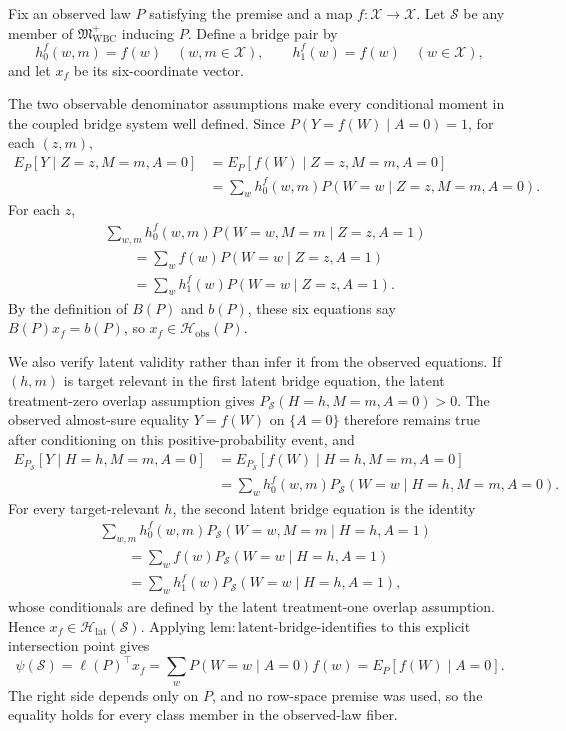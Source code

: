 Fix an observed law \(P\) satisfying the premise and a map
\(f:\mathcal X\to\mathcal X\).  Let \(\mathcal S\) be any member of
\(\mathfrak M_{\mathrm{WBC}}^{+}\) inducing \(P\).  Define a bridge pair by
\[
 h_0^f(w,m)=f(w)\quad(w,m\in\mathcal X),
 \qquad h_1^f(w)=f(w)\quad(w\in\mathcal X),
\]
and let \(x_f\) be its six-coordinate vector.

The two observable denominator assumptions make every conditional moment in
the coupled bridge system well defined.  Since
\(P(Y=f(W)\mid A=0)=1\), for each \((z,m)\),
\[
\begin{aligned}
 E_P[Y\mid Z=z,M=m,A=0]
 &=E_P[f(W)\mid Z=z,M=m,A=0]\\
 &=\sum_w h_0^f(w,m)P(W=w\mid Z=z,M=m,A=0).
\end{aligned}
\]
For each \(z\),
\[
\begin{aligned}
 &\sum_{w,m}h_0^f(w,m)P(W=w,M=m\mid Z=z,A=1)\\
 &\qquad=\sum_w f(w)P(W=w\mid Z=z,A=1)\\
 &\qquad=\sum_w h_1^f(w)P(W=w\mid Z=z,A=1).
\end{aligned}
\]
By the definition of \(B(P)\) and \(b(P)\), these six equations say
\(B(P)x_f=b(P)\), so \(x_f\in\mathcal H_{\mathrm{obs}}(P)\).

We also verify latent validity rather than infer it from the observed
equations.  If \((h,m)\) is target relevant in the first latent bridge
equation, the latent treatment-zero overlap assumption gives
\(P_{\mathcal S}(H=h,M=m,A=0)>0\).  The observed almost-sure equality
\(Y=f(W)\) on \(\{A=0\}\) therefore remains true after conditioning on
this positive-probability event, and
\[
\begin{aligned}
 E_{P_{\mathcal S}}[Y\mid H=h,M=m,A=0]
 &=E_{P_{\mathcal S}}[f(W)\mid H=h,M=m,A=0]\\
 &=\sum_w h_0^f(w,m)
 P_{\mathcal S}(W=w\mid H=h,M=m,A=0).
\end{aligned}
\]
For every target-relevant \(h\), the second latent bridge equation is the
identity
\[
\begin{aligned}
 &\sum_{w,m}h_0^f(w,m)
 P_{\mathcal S}(W=w,M=m\mid H=h,A=1)\\
 &\qquad=\sum_w f(w)P_{\mathcal S}(W=w\mid H=h,A=1)\\
 &\qquad=\sum_w h_1^f(w)P_{\mathcal S}(W=w\mid H=h,A=1),
\end{aligned}
\]
whose conditionals are defined by the latent treatment-one overlap
assumption.  Hence
\(x_f\in\mathcal H_{\mathrm{lat}}(\mathcal S)\).  Applying
\(\mathrm{lem{:}latent\text{-}bridge\text{-}identifies}\) to this explicit
intersection point gives
\[
 \psi(\mathcal S)=\ell(P)^{\top}x_f
 =\sum_w P(W=w\mid A=0)f(w)
 =E_P[f(W)\mid A=0].
\]
The right side depends only on \(P\), and no row-space premise was used, so
the equality holds for every class member in the observed-law fiber.

